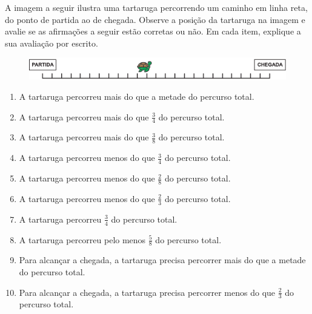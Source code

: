 \documentclass[10 pt,usenames,dvipsnames, oneside]{article}
\begin{document}
A imagem a seguir ilustra uma tartaruga percorrendo um caminho em linha reta, do ponto de partida ao de chegada. Observe a posição da tartaruga na imagem e avalie se as afirmações a seguir estão corretas ou não. Em cada item, explique a sua avaliação por escrito.

\begin{figure}[H]
\centering

\noindent\includegraphics[width=390pt, keepaspectratio]{ativ9_fig01b.png}
\end{figure}

\begin{enumerate} %
\item     A tartaruga percorreu mais do que a metade do percurso total.
\item     A tartaruga percorreu mais do que     $\frac{3}{4}$     do percurso total.
\item     A tartaruga percorreu mais do que     $\frac{3}{8}$     do percurso total.
\item     A tartaruga percorreu menos do que     $\frac{3}{4}$     do percurso total.
\item     A tartaruga percorreu menos do que     $\frac{2}{8}$     do percurso total.
\item     A tartaruga percorreu menos do que     $\frac{2}{3}$     do percurso total.
\item     A tartaruga percorreu     $\frac{3}{4}$     do percurso total.
\item     A tartaruga percorreu pelo menos     $\frac{5}{8}$     do percurso total.
\item     Para alcançar a chegada, a tartaruga precisa percorrer mais do que a metade do percurso total.
\item     Para alcançar a chegada, a tartaruga precisa percorrer menos do que     $\frac{2}{3}$     do percurso total.
\end{enumerate} %
\end{document}
